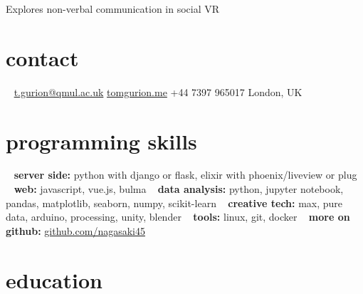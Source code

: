 \documentclass[]{friggeri-cv}
\begin{document}
       {Explores non-verbal communication in social VR}



\begin{aside}
\section{contact}
~
\href{mailto:t.gurion@qmul.ac.uk}{t.gurion@qmul.ac.uk}
\href{http://tomgurion.me}{tomgurion.me}
+44 7397 965017
London, UK
~
\section{programming skills}
~
\textbf{server side:} python with django or flask, elixir with phoenix/liveview or plug
~
\textbf{web:} javascript, vue.js, bulma
~
\textbf{data analysis:} python, jupyter notebook, pandas, matplotlib, seaborn, numpy, scikit-learn
~
\textbf{creative tech:} max, pure data, arduino, processing, unity, blender
~
\textbf{tools:} linux, git, docker
~
\textbf{more on github:} \href{https://github.com/nagasaki45}{github.com/nagasaki45}
\end{aside}



\section{education}
\end{document}
